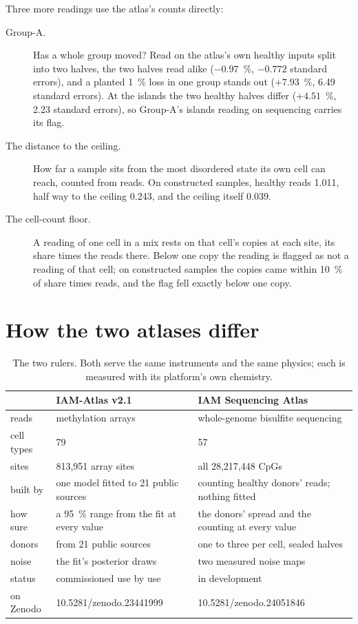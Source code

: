 Three more readings use the atlas's counts directly:
\begin{description}
\item[Group-A.] Has a whole group moved? Read on the atlas's own healthy inputs split into two halves, the two halves read alike ($-0.97$~\%, $-0.772$ standard errors), and a planted 1~\% loss in one group stands out ($+7.93$~\%, 6.49 standard errors). At the islands the two healthy halves differ ($+4.51$~\%, 2.23 standard errors), so Group-A's islands reading on sequencing carries its flag.
\item[The distance to the ceiling.] How far a sample sits from the most disordered state its own cell can reach, counted from reads. On constructed samples, healthy reads 1.011, half way to the ceiling 0.243, and the ceiling itself 0.039.
\item[The cell-count floor.] A reading of one cell in a mix rests on that cell's copies at each site, its share times the reads there. Below one copy the reading is flagged as not a reading of that cell; on constructed samples the copies came within 10~\% of share times reads, and the flag fell exactly below one copy.
\end{description}

\section{How the two atlases differ}

\begin{table}[htbp]\centering\small
\caption{The two rulers. Both serve the same instruments and the same physics; each is measured with its platform's own chemistry.}\label{tab:two_atlases}
\begin{tabular}{@{}p{}p{}p{}@{}}\toprule
 & IAM-Atlas v2.1 & IAM Sequencing Atlas \\\midrule
reads & methylation arrays & whole-genome bisulfite sequencing \\
cell types & 79 & 57 \\
sites & 813,951 array sites & all 28,217,448 CpGs \\
built by & one model fitted to 21 public sources & counting healthy donors' reads; nothing fitted \\
how sure & a 95~\% range from the fit at every value & the donors' spread and the counting at every value \\
donors & from 21 public sources & one to three per cell, sealed halves \\
noise & the fit's posterior draws & two measured noise maps \\
status & commissioned use by use & in development \\
on Zenodo & 10.5281/zenodo.23441999 & 10.5281/zenodo.24051846 \\
\bottomrule
\end{tabular}
\end{table}

